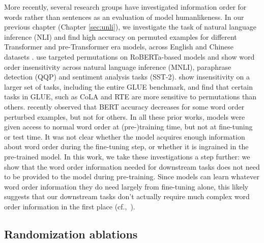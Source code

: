 \documentclass[letterpaper, 12pt]{report}
\begin{document}
More recently, several research groups have investigated information order for words rather than sentences as an evaluation of model humanlikeness. %
In our previous chapter (Chapter \autoref{sec:unli}), we investigate the task of natural language inference (NLI) and find high accuracy on permuted examples for different Transformer and pre-Transformer era models, across English and Chinese datasets \citep{hu-etal-2020-ocnli}.
\citet{gupta-etal-2021-bert} use targeted permutations on RoBERTa-based models and show word order insensitivity across natural language inference (MNLI), paraphrase detection (QQP) and sentiment analysis tasks (SST-2).
\citet{pham-etal-2020-out} show insensitivity on a larger set of tasks, including the entire GLUE benchmark, and find that certain tasks in GLUE, such as CoLA and RTE are more sensitive to permutations than others.
\cite{ettinger-2020-whatbertisnot} recently observed that BERT accuracy decreases for some word order perturbed examples, but not for others.
In all these prior works, models were given access to normal word order at (pre-)training time, but not at fine-tuning or test time. It was not clear whether the model acquires enough information about word order during the fine-tuning step, or whether it is ingrained in the pre-trained model.
In this work, we take these investigations a step further: we show that the word order information needed for downstream tasks does not need to be provided to the model during pre-training. Since models can learn whatever word order information they do need largely from fine-tuning alone, this likely suggests that our downstream tasks don't actually require much complex word order information in the first place (cf.,\ \citealt{glavas-vulic-2021-supervised}).

\subsection{Randomization ablations}
\end{document}
